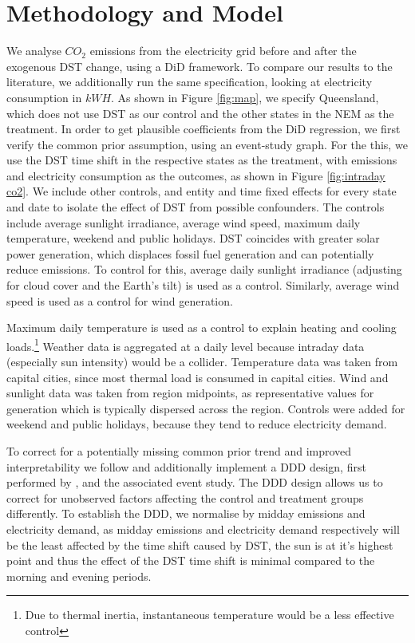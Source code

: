 \section{Methodology and Model}

We analyse $CO_2$ emissions from the electricity grid before and after the exogenous \ac{DST} change, using a \acf{DiD} framework. To compare our results to the literature, we additionally run the same specification, looking at electricity consumption in $kWH$. As shown in Figure \ref{fig:map}, we specify Queensland, which does not use \ac{DST} as our control and the other states in the \ac{NEM} as the treatment. In order to get plausible coefficients from the \ac{DiD} regression, we first verify the common prior assumption, using an event-study graph.
For the this, we use the \ac{DST} time shift in the respective states as the treatment, with emissions and electricity consumption as the outcomes, as shown in Figure \ref{fig:intraday co2}. We include other controls, and entity and time fixed effects for every state and date to isolate the effect of \ac{DST} from possible confounders. 
The controls include average sunlight irradiance, average wind speed, maximum daily temperature, weekend and public holidays.
\ac{DST} coincides with greater solar power generation, which displaces fossil fuel generation and can potentially reduce emissions. To control for this, average daily sunlight irradiance (adjusting for cloud cover and the Earth's tilt) is used as a control. Similarly, average wind speed is used as a control for wind generation.

Maximum daily temperature is used as a control to explain heating and cooling loads.\footnote{Due to thermal inertia, instantaneous temperature would be a less effective control}
Weather data is aggregated at a daily level because intraday data (especially sun intensity) would be a collider.
Temperature data was taken from capital cities, since most thermal load is consumed in capital cities. Wind and sunlight data was taken from region midpoints, as representative values for generation which is typically dispersed across the region.
Controls were added for weekend and public holidays, because they tend to reduce electricity demand.

To correct for a potentially missing common prior trend and improved interpretability we follow \textcite{kellogg_daylight_2008} and additionally implement a \ac{DDD} design, first performed by \textcite{gruber_incidence_1994}, and the associated event study. The DDD design allows us to correct for unobserved factors affecting the control and treatment groups differently. To establish the \ac{DDD}, we normalise by midday emissions and electricity demand, as midday emissions and electricity demand respectively will be the least affected by the time shift caused by DST, the sun is at it's highest point and thus the effect of the DST time shift is minimal compared to the morning and evening periods.

